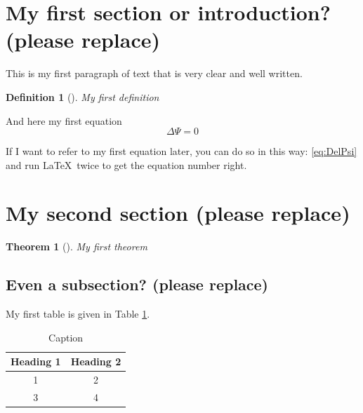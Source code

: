 \documentclass[11pt,a4paper]{article}
\newtheorem{theorem}{Theorem}[section]
\newtheorem*{defn}{Definition}
\begin{document}
\newpage

\tableofcontents
\listoftables
\listoffigures

\newpage
{}


\section{My first section or introduction? (please replace)}

This is my first paragraph of text that is very clear and well written. 

\begin{defn}[\citet{cite-ex1}]
My first definition
\end{defn}

And here my first equation 
\begin{equation} \label{eq:DelPsi}
\Delta \Psi = 0
\end{equation}

If I want to refer to my first equation later, you can do so in this way: \eqref{eq:DelPsi} and run \LaTeX\ twice to get the equation number right. 



\section{My second section (please replace)}

\begin{theorem}[\citet{cite-ex2}]
My first theorem
\end{theorem}

\subsection{Even a subsection? (please replace)}
My first table is given in Table \ref{tab:my_label}.
\begin{table}[h]
    \centering
    \begin{tabular}{c|c}
    Heading 1 & Heading 2 \\
    \hline
       1  & 2 \\
      3   & 4\\
      \hline
    \end{tabular}
    \caption{Caption}
    \label{tab:my_label}
\end{table}
\end{document}
